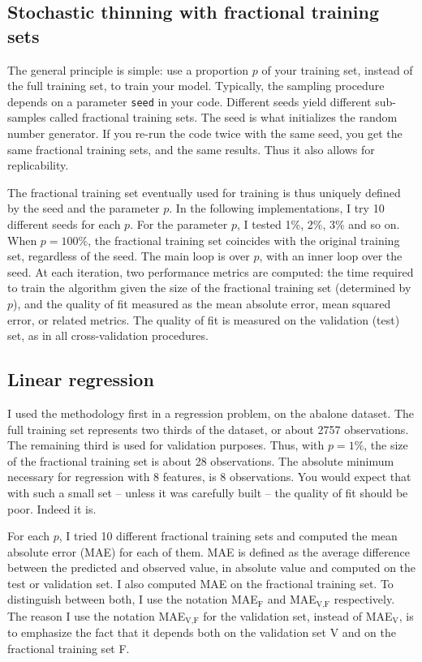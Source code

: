 \documentclass[oneside,10pt]{book}
\begin{document}
\subsection{Stochastic thinning with fractional training sets}

The general principle is simple: use a proportion $p$ of your training set, instead of the full training set, to train your model. Typically,
  the sampling procedure depends on a parameter \texttt{seed} in your code. Different seeds yield different sub-samples called 
\textcolor{index}{fractional training sets}. The seed is what initializes the random number generator. If you re-run the code twice with the same seed, you get the same fractional training sets, and the same results. Thus it also allows for replicability. 

The fractional training set eventually used for training is thus uniquely defined by the seed and the parameter $p$. In the following implementations, I try 10 different seeds for each $p$. For the parameter $p$, I tested 1\%, 2\%, 3\% and so on. When $p=100\%$, the fractional training set coincides with the original training set, regardless of the seed. The main loop is over $p$, with an inner loop 
 over the seed. At each iteration, two performance metrics are computed: the time required to train the algorithm given the size
 of the fractional training set (determined by $p$), and the quality of fit measured as the mean absolute error, mean squared error, or related metrics.  The quality of fit is measured on the validation (test) set, as in all cross-validation procedures.

\subsection{Linear regression}\label{linregd6}

I used the methodology first in a regression problem, on the abalone dataset. The full training set represents two thirds of the dataset, or about 2757 observations. The remaining third is used for validation purposes. Thus, with $p=1\%$, the size of the fractional training set is 
 about 28 observations. The absolute minimum necessary for regression with 8 features, is 8 observations. You would expect that with such a small set -- unless it was carefully built --  the quality of fit should be poor. Indeed it is.

For each $p$, I tried 10 different fractional training sets and computed the mean absolute error (MAE) for each of them. MAE is defined
  as the average difference between the predicted and observed value, in absolute value and computed on the test or validation set. I also
 computed MAE on the fractional training set. To distinguish between both, I use the notation 
 MAE$_\text{F}$ and MAE$_{\text{V,F}}$ respectively. The reason I use the notation MAE$_{\text{V,F}}$ for the validation set, instead 
 of MAE$_{\text{V}}$, is to emphasize the fact that it depends both on the validation set V and on the fractional training set F.
\end{document}
